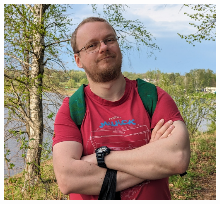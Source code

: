 \documentclass[10pt,A4]{article}
\begin{document}
\pagestyle{fancy}	


\vspace{-20.55pt}


\hspace{-0.25\linewidth}\colorbox{bgcol}{}



\begin{figure}[H]
\begin{flushright}
	\includegraphics[clip,width=0.3\linewidth]{myfoto.jpg}	%
\end{flushright}
\end{figure}


\end{document}
